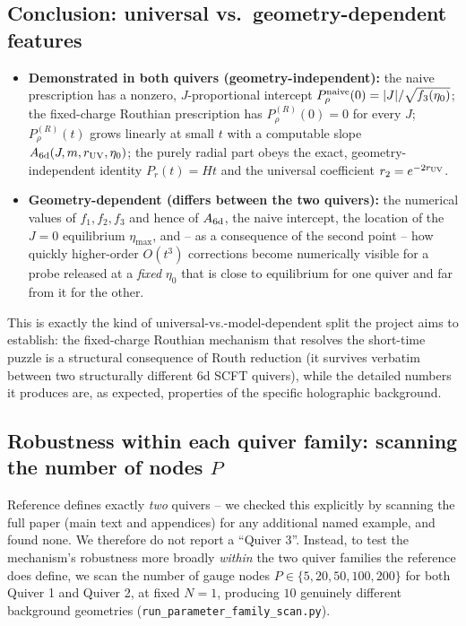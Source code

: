 \documentclass[11pt]{article}
\begin{document}
\subsection{Conclusion: universal vs.\ geometry-dependent features}

\begin{itemize}
\item \textbf{Demonstrated in both quivers (geometry-independent):} the naive prescription has a nonzero, $J$-proportional intercept $P_\rho^{\rm naive}(0)=|J|/\sqrt{f_3(\eta_0)}$; the fixed-charge Routhian prescription has $P_\rho^{(R)}(0)=0$ for every $J$; $P_\rho^{(R)}(t)$ grows linearly at small $t$ with a computable slope $A_{\rm 6d}(J,m,r_{\rm UV},\eta_0)$; the purely radial part obeys the exact, geometry-independent identity $P_r(t)=Ht$ and the universal coefficient $r_2=e^{-2r_{\rm UV}}$.
\item \textbf{Geometry-dependent (differs between the two quivers):} the numerical values of $f_1,f_2,f_3$ and hence of $A_{\rm 6d}$, the naive intercept, the location of the $J=0$ equilibrium $\eta_{\max}$, and -- as a consequence of the second point -- how quickly higher-order $O(t^3)$ corrections become numerically visible for a probe released at a \emph{fixed} $\eta_0$ that is close to equilibrium for one quiver and far from it for the other.
\end{itemize}
This is exactly the kind of universal-vs.-model-dependent split the project aims to establish: the fixed-charge Routhian mechanism that resolves the short-time puzzle is a structural consequence of Routh reduction (it survives verbatim between two structurally different 6d SCFT quivers), while the detailed numbers it produces are, as expected, properties of the specific holographic background.

\subsection{Robustness within each quiver family: scanning the number of nodes $P$}
\label{subsec:Pscan}

Reference \cite{Fatemiabhari:2026rob} defines exactly \emph{two} quivers -- we checked this explicitly by scanning the full paper (main text and appendices) for any additional named example, and found none. We therefore do not report a ``Quiver 3''. Instead, to test the mechanism's robustness more broadly \emph{within} the two quiver families the reference does define, we scan the number of gauge nodes $P\in\{5,20,50,100,200\}$ for both Quiver 1 and Quiver 2, at fixed $N=1$, producing $10$ genuinely different background geometries (\texttt{run\_parameter\_family\_scan.py}).
\end{document}
